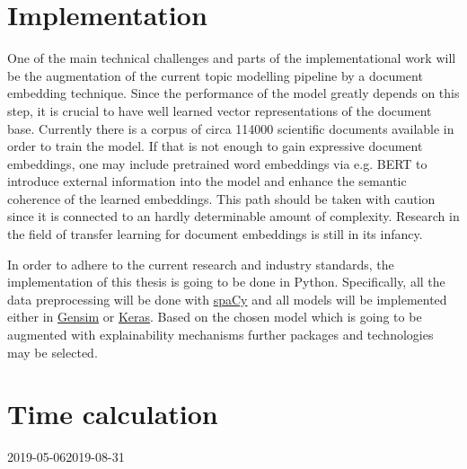 \documentclass[pdftex,a4paper,12pt]{scrartcl}
\begin{document}
\section{Implementation}

One of the main technical challenges and parts of the implementational work will be the augmentation of the current topic modelling pipeline by a document embedding technique. Since the performance of the model greatly depends on this step, it is crucial to have well learned vector representations of the document base. Currently there is a corpus of circa 114000 scientific documents available in order to train the model. If that is not enough to gain expressive document embeddings, one may include pretrained word embeddings via e.g. BERT \cite{devlinBERTPretrainingDeep2018} to introduce external information into the model and enhance the semantic coherence of the learned embeddings. This path should be taken with caution since it is connected to an hardly determinable amount of complexity. Research in the field of transfer learning for document embeddings is still in its infancy.

In order to adhere to the current research and industry standards, the implementation of this thesis is going to be done in Python. Specifically, all the data preprocessing will be done with \href{https://spacy.io/}{spaCy} and all models will be  implemented either in \href{https://radimrehurek.com/gensim/}{Gensim} or \href{https://keras.io/}{Keras}. Based on the chosen model which is going to be augmented with explainability mechanisms further packages and technologies may be selected.

\section{Time calculation}

\begin{ganttchart}[
	hgrid,
	vgrid={*{6}{draw=none}, dotted},
	x unit=0.115cm,
	expand chart=\textwidth,
	time slot format=isodate,
	calendar week text = {\currentweek{}},
	milestone left shift =-1,
	milestone right shift =2,
	chart element start border=right,
	link bulge = 1.3,
	link/.style={-to, rounded corners = 3pt}
	]{2019-05-06}{2019-08-31}
	 \\
	 \\
	 \\
	 \\
	  \\
	 \\
\end{ganttchart}


\newpage
{}
{}   %
\end{document}
